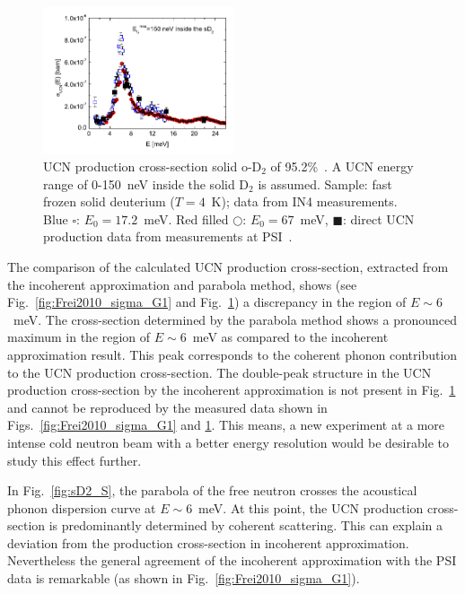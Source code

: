 \begin{figure}[h!]
\begin{center}
   \includegraphics[width=0.5\textwidth]{Frei2010_sigma.PNG} \caption{\cite{Frei2010}
    UCN production cross-section solid o-D$_2$ of
    95.2\%~\cite{Frei2010}. A UCN energy range of 0-150~neV inside
    the solid D$_2$ is assumed. Sample: fast frozen solid deuterium
    ($T=4$~K); data from IN4 measurements. Blue $\square$:
    $E_0=17.2$~meV. Red filled $\bigcirc$: $E_0=67$~meV,
    $\blacksquare$: direct UCN production data from measurements at
    PSI~\cite{Atchison2007}.  }
    \label{fig:Frei2010fig2}
    \end{center}
\end{figure} 

The comparison of the calculated UCN production cross-section,
extracted from the incoherent approximation and parabola method, shows
(see Fig.~\ref{fig:Frei2010_sigma_G1} and Fig.~\ref{fig:Frei2010fig2})
a discrepancy in the region of $E\sim6$~meV.  The cross-section
determined by the parabola method shows a pronounced maximum in the
region of $E\sim6$~meV as compared to the incoherent approximation
result. This peak corresponds to the coherent phonon contribution to
the UCN production cross-section. The double-peak structure in the UCN
production cross-section by the incoherent approximation is not
present in Fig.~\ref{fig:Frei2010fig2} and cannot be reproduced by the
measured data shown in Figs.~\ref{fig:Frei2010_sigma_G1}
and \ref{fig:Frei2010fig2}.  This means, a new experiment at a more
intense cold neutron beam with a better energy resolution would be
desirable to study this effect further.

In Fig.~\ref{fig:sD2_S}, the parabola of the free neutron crosses the
acoustical phonon dispersion curve at $E \sim 6$~meV. At this point,
the UCN production cross-section is predominantly determined by
coherent scattering.  This can explain a deviation from the production
cross-section in incoherent approximation. Nevertheless the general
agreement of the incoherent approximation with the PSI data is
remarkable (as shown in Fig.~\ref{fig:Frei2010_sigma_G1}).


